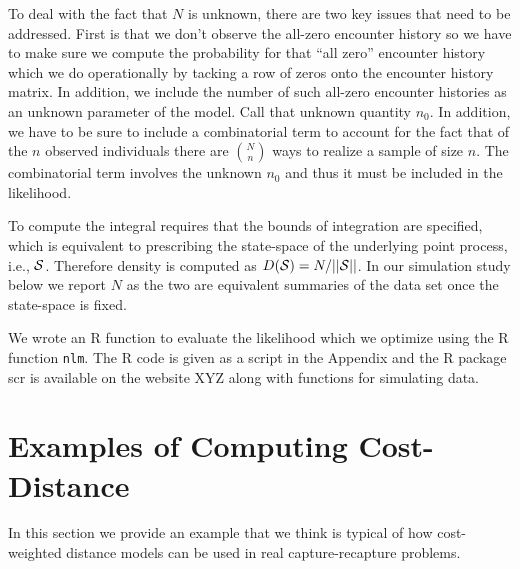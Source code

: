 To deal with the fact that $N$ is unknown, 
there are two key issues that need to be addressed.
First is that 
we don't observe the all-zero encounter history so we have to
make sure we compute the probability for that ``all zero'' encounter history which
we do operationally by tacking a row of zeros onto the encounter history matrix. In
addition, we include the number of such all-zero encounter histories
as an unknown parameter of the model. Call that unknown quantity $n_{0}$.
In addition, we have to be sure to include a combinatorial term to
account for the fact that of the $n$ observed individuals there are
${N \choose n}$
 ways to realize a sample of size $n$. The combinatorial term
involves the unknown $n_{0}$ and thus it must be included in the likelihood.

To compute the integral requires that the bounds of integration are
specified, which is equivalent to prescribing the state-space of the
underlying point process, i.e., ${\cal S}$. Therefore density is
computed as $D({\cal S}) = N/||{\cal S}||$. In our simulation study
below we report $N$ as the two are equivalent summaries of the data
set once the state-space is fixed. 

We wrote an R function to evaluate the likelihood which we optimize
using the R function \mbox{\tt nlm}.
The R code is given as a script in the Appendix and the R package scr
is available on the website XYZ along with functions for simulating
data.


\section{Examples of Computing Cost-Distance}

In this section we provide an example that we think is typical of 
how cost-weighted distance models can be used in real
capture-recapture problems.

